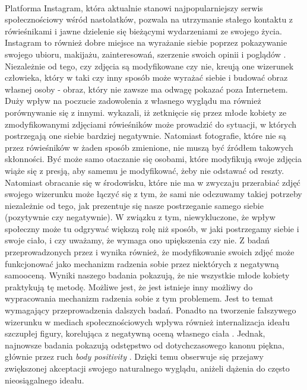 \documentclass[12pt,a4paper,final,oneside,onecolumn,titlepage]{article}
\begin{document}
\paragraph{}
Platforma Instagram, która aktualnie stanowi najpopularniejszy serwis społecznościowy wśród nastolatków, pozwala na utrzymanie stałego kontaktu z rówieśnikami i jawne dzielenie się bieżącymi wydarzeniami ze swojego życia. Instagram to również dobre miejsce na wyrażanie siebie poprzez pokazywanie swojego ubioru, makijażu, zainteresowań, szerzenie swoich opinii i poglądów \citep{longobardi_follow_2020}. Niezależnie od tego, czy zdjęcia są modyfikowane czy nie, kreują one wizerunek człowieka, który w taki czy inny sposób może wyrażać siebie i budować obraz własnej osoby - obraz, który nie zawsze ma odwagę pokazać poza Internetem. Duży wpływ na poczucie zadowolenia z własnego wyglądu ma również porównywanie się z innymi. \citet{kleemans_picture_2018} wykazali, iż zetknięcie się przez młode kobiety ze zmodyfikowanymi zdjęciami rówieśników może prowadzić do sytuacji, w których postrzegają one siebie bardziej negatywnie. Natomiast fotografie, które nie są przez rówieśników w żaden sposób zmienione, nie muszą być  źródłem takowych skłonności. Być może samo otaczanie się osobami, które modyfikują swoje zdjęcia wiąże się z presją, aby samemu je modyfikować, żeby nie odstawać od reszty. Natomiast obracanie się w środowisku, które nie ma w zwyczaju przerabiać zdjęć swojego wizerunku może łączyć się z tym, że sami nie odczuwamy takiej potrzeby niezależnie od tego, jak prezentuje się nasze postrzeganie samego siebie (pozytywnie czy negatywnie). W związku z tym, niewykluczone, że wpływ społeczny może tu odgrywać większą rolę niż sposób, w jaki postrzegamy siebie i swoje ciało, i czy uważamy, że wymaga ono upiększenia czy nie. Z badań przeprowadzonych przez \citet{kleemans_picture_2018} i \citet{lyu_travel_2016} wynika również, że modyfikowanie swoich zdjęć może funkcjonować jako mechanizm radzenia sobie przez niektórych z negatywną samooceną. Wyniki naszego badania pokazują, że nie wszystkie młode kobiety praktykują tę metodę. Możliwe jest, że jest istnieje inny możliwy do wypracowania mechanizm radzenia sobie z tym problemem. Jest to temat wymagający przeprowadzenia dalszych badań. Ponadto na tworzenie fałszywego wizerunku w mediach społecznościowych wpływa również internalizacja ideału szczupłej  figury, korelująca z negatywną oceną własnego ciała \citep{blowers_relationship_2003}. Jednak, najnowsze badania pokazują odstępstwo od dotychczasowego kanonu piękna, głównie przez ruch \textit{body positivity} \citep{LAZUKA202085}. Dzięki temu obserwuje się przejawy zwiększonej akceptacji swojego naturalnego wyglądu, aniżeli dążenia do często nieosiągalnego ideału.
\end{document}
